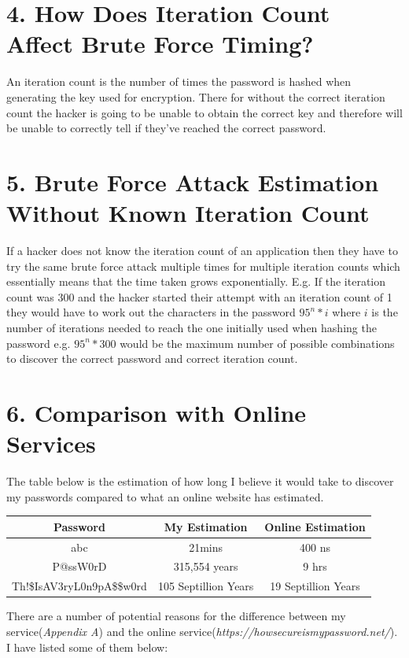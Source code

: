 \documentclass[a4paper, twoside, 11pt]{article}
\begin{document}
\section*{4. How Does Iteration Count Affect Brute Force Timing?}
An iteration count is the number of times the password is hashed when generating the key used for encryption.
 There for without the correct iteration count the hacker is going to be unable to obtain the correct key and
  therefore will be unable to correctly tell if they've reached the correct password.

\section*{5. Brute Force Attack Estimation Without Known Iteration Count}
If a hacker does not know the iteration count of an application then they have to try the same brute
force attack multiple times for multiple iteration counts which essentially means that the time taken grows exponentially.
E.g. If the iteration count was 300 and the hacker started their attempt with an iteration count of 1 they would have
to work out the characters in the password $95^n*i$ where $i$ is the number of iterations needed to reach the one initially
used when hashing the password e.g. $95^n*300$ would be the maximum number of possible combinations to discover the correct password and correct iteration count.

\section*{6. Comparison with Online Services}
The table below is the estimation of how long I believe it would take to discover my passwords compared to what an online website has estimated.
\begin{center}
	\begin{tabular}{ |c|c|c| } 
	 \hline
	 Password & My Estimation & Online Estimation  \\
	 \hline
	 abc & 21mins & 400 ns \\ 
	 P@ssW0rD & 315,554 years & 9 hrs \\ 
	 Th!\$IsAV3ryL0n9pA\$\$w0rd & 105 Septillion Years & 19 Septillion Years \\ 
	 \hline
	\end{tabular}
\end{center}

There are a number of potential reasons for the difference between my service(\textit{Appendix A})
 and the online service(\textit{https://howsecureismypassword.net/}). I have listed some of them below:
\end{document}
